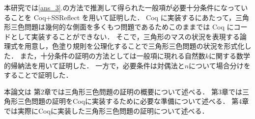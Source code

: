 本研究では\ref{ans_3}.の方法で推測して得られた一般項が必要十分条件になっていることを Coq+SSReflect を用いて証明した．
Coq に実装するにあたって，三角形三色問題は幾何的な側面を多くもつ問題であるためこのままでは Coq にコードとして実装することができない．
そこで，三角形のマスの状況を表現する論理式を用意し，色塗り規則を公理化することで三角形三色問題の状況を形式化した．
また，十分条件の証明の方法としては一般項に現れる自然数$k$に関する数学的帰納法を用いて証明した．
一方で，必要条件は対偶法と$n$について場合分けをすることで証明した．

本論文は
第$2$章では三角形三色問題の証明の概要について述べる．
第$3$章では三角形三色問題の証明をCoqに実装するために必要な準備について述べる．
第$4$章では実際にCoqに実装した三角形三色問題の証明について述べる．
